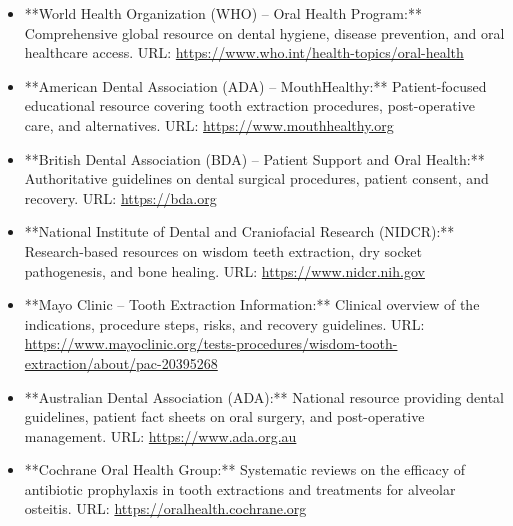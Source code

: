 \begin{itemize}
  \item **World Health Organization (WHO) -- Oral Health Program:** Comprehensive global resource on dental hygiene, disease prevention, and oral healthcare access. URL: \url{https://www.who.int/health-topics/oral-health}
  \item **American Dental Association (ADA) -- MouthHealthy:** Patient-focused educational resource covering tooth extraction procedures, post-operative care, and alternatives. URL: \url{https://www.mouthhealthy.org}
  \item **British Dental Association (BDA) -- Patient Support and Oral Health:** Authoritative guidelines on dental surgical procedures, patient consent, and recovery. URL: \url{https://bda.org}
  \item **National Institute of Dental and Craniofacial Research (NIDCR):** Research-based resources on wisdom teeth extraction, dry socket pathogenesis, and bone healing. URL: \url{https://www.nidcr.nih.gov}
  \item **Mayo Clinic -- Tooth Extraction Information:** Clinical overview of the indications, procedure steps, risks, and recovery guidelines. URL: \url{https://www.mayoclinic.org/tests-procedures/wisdom-tooth-extraction/about/pac-20395268}
  \item **Australian Dental Association (ADA):** National resource providing dental guidelines, patient fact sheets on oral surgery, and post-operative management. URL: \url{https://www.ada.org.au}
  \item **Cochrane Oral Health Group:** Systematic reviews on the efficacy of antibiotic prophylaxis in tooth extractions and treatments for alveolar osteitis. URL: \url{https://oralhealth.cochrane.org}
\end{itemize}
